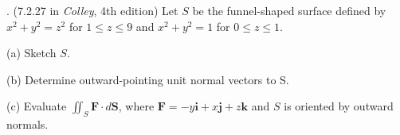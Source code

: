 \documentclass[11pt]{article}
\theoremstyle{definition}
\newcounter{prob}
\newcounter{subprob}
\newcommand\itm{\theprob.  \stepcounter{prob}\setcounter{subprob}{1}}
\newcommand\sol[2]{\iftoggle{solutions}{\begin{proof}[Solution] #1\end{proof}}{#2}}
\renewcommand\vec[1]{\mathbf{#1}}
\begin{document}
\itm (7.2.27 in \textit{Colley}, 4th edition) Let $S$ be the funnel-shaped surface defined by $x^2 + y^2 = z^2$ for $1 \leq  z \leq  9$ and $x^2 + y^2 = 1$ for $0 \leq  z \leq  1$.

(a) Sketch $S$. 

(b) Determine outward-pointing unit normal vectors
to S.

(c) Evaluate $\iint_S \vec{F}\cdot d\vec{S}$, where $\vec{F}=−y\vec{i}+x\vec{j}+z\vec{k}$
and $S$ is oriented by outward normals.

\sol{(a) See the graph below.
  \begin{center}
    \texttt{[image: figures/funnel]}
  \end{center}
(b) The outward pointing unit vectors on the cylindrical part of the cylinder are $x\vec{i} + y \vec{j}$. On the lateral face, the unit normal is $\left(\frac{x}{z\sqrt{2}},\frac{y}{z\sqrt{2}},-\frac{1}{\sqrt{2}}\right)$. (c) We calculate over the cylindrical surface $S_1$
\begin{align*}
  \iint_{S_1} \vec{F}\cdot d\vec{S} = \iint_{S_1} (-y,x,z) \cdot (x,y,0) \,dS = \iint_{S_1} 0 \,dS = 0.
\end{align*} 
Over the conical surface, we calculate 
\begin{align*}
  \iint_{S_2} \vec{F}\cdot d\vec{S} &= \iint_{S_1} (-y,x,z) \cdot \left(\frac{x}{z\sqrt{2}},\frac{y}{z\sqrt{2}},-\frac{1}{\sqrt{2}}\right) \,dS  \\
  &= -\frac{1}{\sqrt{2}} \iint_{S_1} z\,dS. 
\end{align*} 
To evaluate this surface integral, we use slices perpendicular to the $z$-axis. The slice at height $z$ is a thin circular strip of radius $z$ and width $z\sqrt{2}$ (the factor of $\sqrt{2}$ arising from the 45$^\circ$ lean). Thus 
\begin{align*}
  -\frac{1}{\sqrt{2}} \iint_{S_1} z\,dS &= -\frac{1}{\sqrt{2}}\int_1^9 2\pi z (z\sqrt{2})\,dz \\&= 2\pi\left[ z^3/3 \right]_1^9 \\
  &= -1456\pi/3.
\end{align*}
Adding the contributions from $S_1$ and $S_2$, we get $\boxed{-1456\pi/3}$. 
}{\vfill}
\end{document}
